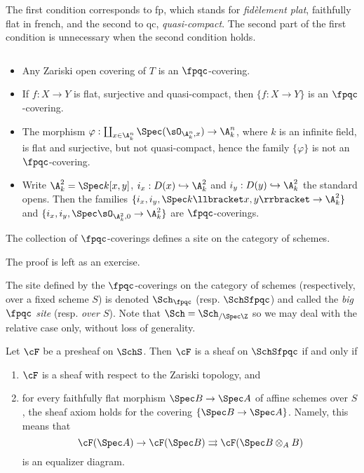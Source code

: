 \begin{remark}
The first condition corresponds to fp, which stands for \emph{fid\`element plat}, faithfully flat in french, and the second to qc, \emph{quasi-compact}. The second part of the first condition is unnecessary when the second condition holds.
\end{remark}

\begin{example}$ $
\begin{itemize}
\item Any Zariski open covering of $T$ is an $\fpqc$-covering.
\item If $f: X \to Y$ is flat, surjective and quasi-compact, then $\{ f: X\to Y\}$ is an $\fpqc$-covering.
\item The morphism $\varphi: \coprod_{x \in \A^n_k} \Spec (\sO_{\A^n_k,x}) \to \A^n_k $, where $k$ is an infinite field, is flat and surjective, but not quasi-compact, hence the family $\{ \varphi \}$ is not an $\fpqc$-covering.
\item Write $\A^2_k = \Spec k[x,y]$, $i_x : D(x) \hookrightarrow \A^2_k$ and $i_y : D(y) \hookrightarrow \A^2_k$ the standard opens. Then the families $\{i_x, i_y, \Spec k\llbracket x,y \rrbracket \to \A^2_k \}$ and $\{i_x, i_y, \Spec \sO_{\A^2_k,0} \to \A^2_k \}$ are $\fpqc$-coverings.
\end{itemize}
\end{example}

\begin{lem}
The collection of $\fpqc$-coverings defines a site on the category of schemes.
\end{lem}

The proof is left as an exercise.

\begin{defi}
The site defined by the $\fpqc$-coverings on the category of schemes (respectively, over a fixed scheme $S$) is denoted $\Sch_\fpqc$ (resp. $\SchSfpqc$)  and called the \emph{big $\fpqc$ site} (resp. \emph{over $S$}). Note that $\Sch = \Sch_{/\Spec\Z}$ so we may deal with the relative case only, without loss of generality. 
\end{defi}

\begin{lem}\label{fpqc-sheaves}
Let $\cF$ be a presheaf on $\SchS$. Then $\cF$ is a sheaf on $\SchSfpqc$ if and only if
\begin{enumerate}[\it i.]
\item $\cF$ is a sheaf with respect to the Zariski topology, and
\item for every faithfully flat morphism $\Spec B \to \Spec A$ of affine schemes over $S$, the sheaf axiom holds for the covering $\{\Spec B \to \Spec A\}$. Namely, this means that 
$$
\cF(\Spec A) \to \cF(\Spec B) \rightrightarrows \cF(\Spec B \otimes_A B)
$$
is an equalizer diagram.
\end{enumerate}
\end{lem}

